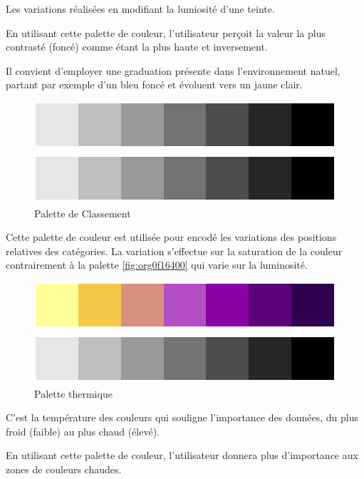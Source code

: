 \documentclass[a4paper,12pt]{article}
\begin{document}
\begin{multicols}{2}
Les variations réalisées en modifiant la lumiosité d'une teinte.\autocite{andreaskrauseBestPracticesData2024} 

En utilisant cette palette de couleur, l'utilisateur perçoit la valeur la plus contrasté (foncé) comme étant la plus haute et inversement. \autocite{kirkDataRepresentation2019}

Il convient d'employer une graduation présente dans l'environnement natuel, partant par exemple d'un bleu foncé et évoluent vers un jaune clair. \autocite{wilkeColorScales2019}


\begin{figure}[H]
\centering
\includegraphics[width=.9\linewidth]{./img/palette-ranking.pdf}
\caption{\label{fig:org69ddbbc}Palette de Classement}
\end{figure}

Cette palette de couleur est utilisée pour encodé les variations des positions relatives des catégories. La variation s'effectue sur la saturation de la couleur contrairement à la palette \ref{fig:org0f16400} qui varie sur la luminosité.

\begin{figure}[H]
\centering
\includegraphics[width=.9\linewidth]{./img/palette-thermique.pdf}
\caption{\label{fig:org231a4fa}Palette thermique}
\end{figure}

C'est la température des couleurs qui souligne l'importance des données, du plus froid (faible) au plus chaud (élevé). \autocite{REF???}

En utilisant cette palette de couleur, l'utilisateur donnera plus d'importance aux zones de couleurs chaudes. \autocite{REF???}


\end{multicols}
\end{document}
